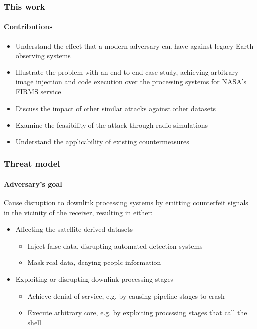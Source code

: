 \documentclass{beamer}
\begin{document}
\begin{frame}
  \frametitle{This work}
  \framesubtitle{Contributions}
  \begin{itemize}[<+->]
    \item Understand the effect that a modern adversary can have against legacy Earth observing systems
    \item Illustrate the problem with an end-to-end case study, achieving arbitrary image injection and code execution over the processing systems for NASA's FIRMS service
    \item Discuss the impact of other similar attacks against other datasets
    \item Examine the feasibility of the attack through radio simulations
    \item Understand the applicability of existing countermeasures
  \end{itemize}
\end{frame}

\begin{frame}
  \frametitle{Threat model}
  \framesubtitle{Adversary's goal}
  Cause disruption to downlink processing systems by emitting counterfeit signals in the vicinity of the receiver, resulting in either:
  \newline

  \begin{itemize}
    \item Affecting the satellite-derived datasets
    \begin{itemize}
      \item Inject false data, disrupting automated detection systems
      \item Mask real data, denying people information
    \end{itemize}
    \item Exploiting or disrupting downlink processing stages
    \begin{itemize}
      \item Achieve denial of service, e.g. by causing pipeline stages to crash
      \item Execute arbitrary core, e.g. by exploiting processing stages that call the shell
    \end{itemize}
  \end{itemize}
\end{frame}
\end{document}

